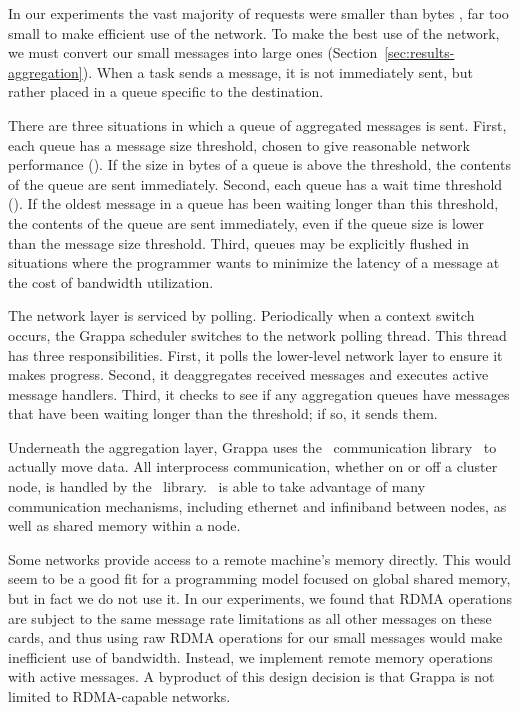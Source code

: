 In our experiments the vast majority of requests were smaller than
 bytes , far too small to make
efficient use of the network. To make the best use of the network, we
must convert our small messages into large ones
(Section~\ref{sec:results-aggregation}).  When a task sends a message,
it is not immediately sent, but rather placed in a queue specific to the
destination.

There are three situations in which a queue of aggregated messages is
sent. First, each queue has a message size threshold, chosen to give
reasonable network performance (). If the size in
bytes of a queue is above the threshold, the contents of the queue are
sent immediately. Second, each queue has a wait time threshold
(). If the oldest message in a queue has been waiting
longer than this threshold, the contents of the queue are sent
immediately, even if the queue size is lower than the message size
threshold.  Third, queues may be explicitly flushed in situations where
the programmer wants to minimize the latency of a message at the cost of
bandwidth utilization.

The network layer is serviced by polling. Periodically when a context
switch occurs, the Grappa scheduler switches to the network polling
thread. This thread has three responsibilities. First, it polls the
lower-level network layer to ensure it makes progress. Second, it
deaggregates received messages and executes active message
handlers. Third, it checks to see if any aggregation queues have
messages that have been waiting longer than the threshold; if so, it
sends them.

Underneath the aggregation layer, Grappa uses the \gasnet~communication
library~\cite{gasnet} to actually move data. All interprocess
communication, whether on or off a cluster node, is handled by the
\gasnet~library. \gasnet~is able to take advantage of many communication
mechanisms, including ethernet and infiniband between nodes, as well as
shared memory within a node.

Some networks provide access to a remote machine's memory directly. This
would seem to be a good fit for a programming model focused on global
shared memory, but in fact we do not use it. In our experiments, we
found that RDMA operations are subject to the same message rate
limitations as all other messages on these cards, and thus using raw
RDMA operations for our small messages would make inefficient use of
bandwidth. Instead, we implement remote memory operations with active
messages. A byproduct of this design decision is that Grappa is not
limited to RDMA-capable networks.

